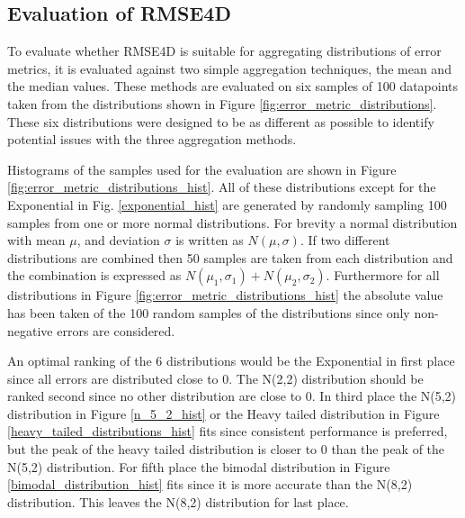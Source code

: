 \subsection{Evaluation of RMSE4D}
To evaluate whether RMSE4D is suitable for aggregating distributions of error metrics, it is evaluated against two simple aggregation techniques, the mean and the median values. These methods are evaluated on six samples of 100 datapoints taken from the distributions shown in Figure \ref{fig:error_metric_distributions}. These six distributions were designed to be as different as possible to identify potential issues with the three aggregation methods.

Histograms of the samples used for the evaluation are shown in Figure \ref{fig:error_metric_distributions_hist}. All of these distributions except for the Exponential in Fig. \ref{exponential_hist} are generated by randomly sampling 100 samples from one or more normal distributions. For brevity a normal distribution with mean $\mu$, and deviation $\sigma$ is written as \(N(\mu,\sigma)\). If two different distributions are combined then 50 samples are taken from each distribution and the combination is expressed as \(N(\mu_1,\sigma_1) + N(\mu_2,\sigma_2)\). Furthermore for all distributions in Figure \ref{fig:error_metric_distributions_hist} the absolute value has been taken of the 100 random samples of the distributions since only non-negative errors are considered.

An optimal ranking of the 6 distributions would be the Exponential in first place since all errors are distributed close to 0. The N(2,2) distribution should be ranked second since no other distribution are close to 0. In third place the N(5,2) distribution in Figure \ref{n_5_2_hist} or the Heavy tailed distribution in Figure \ref{heavy_tailed_distributions_hist} fits since consistent performance is preferred, but the peak of the heavy tailed distribution is closer to 0 than the peak of the N(5,2) distribution. For fifth place the bimodal distribution in Figure \ref{bimodal_distribution_hist} fits since it is more accurate than the N(8,2) distribution. This leaves the N(8,2) distribution for last place.

